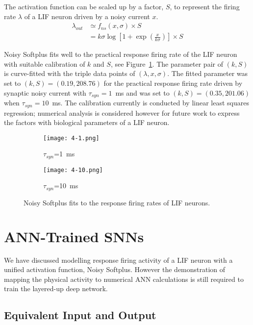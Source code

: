 \documentclass[runningheads,a4paper]{llncs}
\begin{document}
The activation function can be scaled up by a factor, $S$, to represent the firing rate $\lambda$ of a LIF neuron driven by a noisy current $x$.
\begin{equation}
\begin{aligned}
\lambda_{out} &\simeq f_{ns}(x, \sigma) \times S\\
&=k \sigma \log [1 + \exp(\frac{x}{k \sigma})] \times S
\end{aligned}
\label{equ:fit}
\end{equation}	

Noisy Softplus fits well to the practical response firing rate of the LIF neuron with suitable calibration of $k$ and $S$, see Figure~\ref{Fig:nsptau1}.
The parameter pair of $(k, S)$ is curve-fitted with the triple data points of $(\lambda, x, \sigma)$.
The fitted parameter was set to $(k, S)=(0.19,208.76)$ for the practical response firing rate driven by synaptic noisy current with $\tau_{syn}=1$~ms and was set to $(k, S)=(0.35,201.06)$ when $\tau_{syn}=10$~ms.
The calibration currently is conducted by linear least squares regression; numerical analysis is considered however for future work to express the factors with biological parameters of a LIF neuron.

\begin{figure}
	\centering
	\begin{subfigure}[t]{0.49\textwidth}
		\texttt{[image: 4-1.png]}
		\caption{$\tau_{syn}$=1~ms}
	\end{subfigure}
	\begin{subfigure}[t]{0.49\textwidth}
		\texttt{[image: 4-10.png]}
		\caption{$\tau_{syn}$=10~ms}
	\end{subfigure}
	\caption{Noisy Softplus fits to the response firing rates of LIF neurons.}
	\label{Fig:nsptau1}
\end{figure}		


\section{ANN-Trained SNNs}
\label{sec:ann_train_snn}
We have discussed modelling response firing activity of a LIF neuron with a unified activation function, Noisy Softplus.
However the demonstration of mapping the physical activity to numerical ANN calculations is still required to train the layered-up deep network.

\subsection{Equivalent Input and Output}
\end{document}
